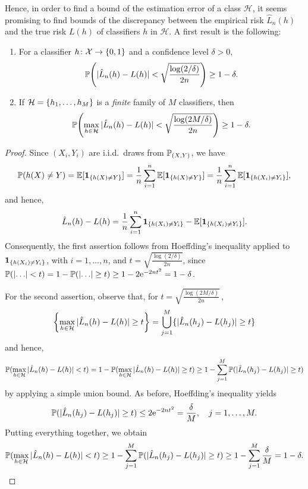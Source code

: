 Hence, in order to find a bound of the estimation error of a class $\mathcal{H}$, it seems promising to find bounds of the discrepancy between the empirical risk $\hat{L}_n(h)$ and the true risk $L(h)$ of classifiers $h$ in $\mathcal{H}$. A first result is the following:

\begin{theorem}
\label{thm: empirical vs true risk}
\begin{enumerate}
    \item For a classifier $h \colon \mathcal{X} \to \set{0, 1}$ and a confidence level $\delta > 0$,
    \[
        \P\left(\abs*{\hat{L}_n(h) - L(h)} < \sqrt{\frac{\log(2 / \delta)}{2n}}\right) \geq 1 - \delta.
    \]

    \item If $\mathcal{H} = \set{h_1, \dots, h_M}$ is a \emph{finite} family of $M$ classifiers, then
    \[
        \P\left(\max_{h \in \mathcal{H}} \abs*{\hat{L}_n(h) - L(h)} < \sqrt{\frac{\log(2M / \delta)}{2n}}\right) \geq 1 - \delta.
    \]
\end{enumerate}
\end{theorem}

\begin{proof}
Since $(X_i, Y_i)$ are i.i.d.\ draws from $\P_{(X, Y)}$, we have
\[
    \P(h(X) \neq Y) = \Exp[\indSet{h(X) \neq Y}] = \frac{1}{n} \sum_{i=1}^n \Exp[\indSet{h(X) \neq Y}] = \frac{1}{n} \sum_{i=1}^n \Exp[\indSet{h(X_i) \neq Y_i}],
\]
and hence,
\[
    \hat{L}_n(h) - L(h) = \frac{1}{n} \sum_{i=1}^n \indSet{h(X_i) \neq Y_i} - \Exp[\indSet{h(X_i) \neq Y_i}].
\]
Consequently, the first assertion follows from Hoeffding's inequality applied to $\indSet{h(X_i) \neq Y_i}$, with $i = 1, \dots, n$, and $t = \sqrt{\frac{\log(2 / \delta)}{2n}}$, since $\P(\abs{\ldots} < t) = 1 - \P(\abs{\ldots} \geq t) \geq 1 - 2\e^{-2nt^2} = 1 - \delta$.

For the second assertion, observe that, for $t = \sqrt{\frac{\log(2M/\delta)}{2n}} \,$,
\[
    \set{\max_{h \in \mathcal{H}} \abs*{\hat{L}_n(h) - L(h)} \geq t} = \bigcup_{j=1}^M \{\abs*{\hat{L}_n(h_j) - L(h_j)} \geq t\}
\]
and hence,
\[
    \P(\max_{h \in \mathcal{H}} \abs*{\hat{L}_n(h) - L(h)} < t) = 1 - \P(\max_{h \in \mathcal{H}} \abs*{\hat{L}_n(h) - L(h)} \geq t) \geq 1 - \sum_{j=1}^M \P(\abs*{\hat{L}_n(h_j) - L(h_j)} \geq t)
\]
by applying a simple union bound. As before, Hoeffding's inequality yields
\[
    \P(\abs*{\hat{L}_n(h_j) - L(h_j)} \geq t) \leq 2 \e^{-2nt^2} = \frac{\delta}{M}, \quad j = 1, \dots, M.
\]
Putting everything together, we obtain
\[
    \P(\max_{h \in \mathcal{H}} \abs*{\hat{L}_n(h) - L(h)} < t) \geq 1 - \sum_{j=1}^M \P(\abs*{\hat{L}_n(h_j) - L(h_j)} \geq t) \geq 1 - \sum_{j=1}^M \frac{\delta}{M} = 1 - \delta. \qedhere
\]
\end{proof}

